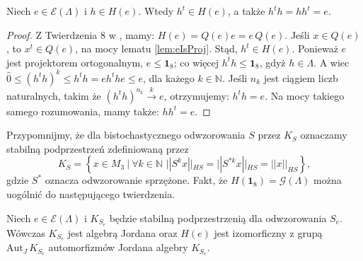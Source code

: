 \begin{Theorem}
\label{prop:htranspose}
Niech $e \in \mathcal{E}(\Lambda)$ i $h \in H(e)$.
Wtedy $h^{t} \in H(e)$, a także $h^{t} h = h h^{t} = e$.
\end{Theorem}
\begin{proof}
    Z Twierdzenia 8  w \cite{schwarz1955hausdorff}, mamy:
    $H(e) = Q(e) e = e \, Q(e)$.
Jeśli $x \in Q(e)$, to $x^{t} \in Q(e)$,
na mocy lematu \ref{lem:eIsProj}.
Stąd, $h^{t} \in H(e)$.
Ponieważ $e$ jest projektorem ortogonalnym, $e \leq \mathbf{1}_{8}$;
co więcej $h^{t} h \leq \mathbf{1}_{8}$, gdyż $h \in \Lambda$.
A wiec $\hat{0} \leq (h^{t} h)^{k} \leq h^{t} h = e h^{t} h e \leq e$,
dla każego $k \in \mathbb{N}$.
Jeśli $n_{k}$ jest ciągiem liczb naturalnych, takim że
    $(h^{t} h)^{n_{k}} \overset{k}{\rightarrow} e$,
otrzymujemy: $h^{t} h = e$.
Na mocy takiego samego rozumowania, mamy także: $h h^{t} = e$.
\end{proof}

Przypomnijmy, że dla  bistochastycznego odwzorowania $S$
przez $K_{S}$ oznaczamy stabilną podprzestrzeń zdefiniowaną przez
\begin{equation}
    K_{S} = \left \{ x \in M_{3} \:|\:
            \forall k \in \mathbb{N} \,\,
            || S^{k} x ||_{HS} = || S^{*k} x ||_{HS} =  ||x||_{HS}
    \right \},
\end{equation}
gdzie $S^{*}$ oznacza odwzorowanie sprzężone.
Fakt, że $H(\mathbf{1}_{8}) = \mathcal{G}(\Lambda)$
można uogólnić do następującego twierdzenia.
\begin{Theorem}
    Niech $e \in \mathcal{E}(\Lambda)$ i
    $K_{S_{e}}$ będzie stabilną podprzestrzenią dla odwzorowania $S_{e}$.
    Wówczas $K_{S_{e}}$ jest algebrą Jordana oraz
    $H(e)$ jest izomorficzny z grupą $\text{Aut}_{J} \, K_{S_{e}}$
    automorfizmów Jordana algebry $K_{S_{e}}$.
\end{Theorem}

